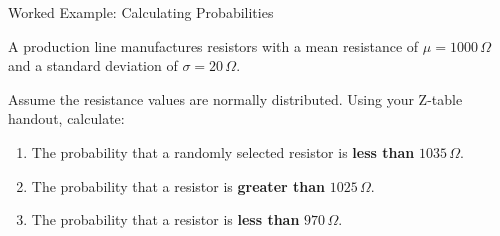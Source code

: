 \begin{frame}{Worked Example: Calculating Probabilities}
    \begin{example}
        A production line manufactures resistors with a mean resistance of $\mu = 1000\,\Omega$ and a standard deviation of $\sigma = 20\,\Omega$. 
        
        \vspace{0.2cm}
        Assume the resistance values are normally distributed. Using your Z-table handout, calculate:
        \begin{enumerate}
            \item The probability that a randomly selected resistor is \textbf{less than} $1035\,\Omega$.
            \item The probability that a resistor is \textbf{greater than} $1025\,\Omega$.
            \item The probability that a resistor is \textbf{less than} $970\,\Omega$.
        \end{enumerate}
    \end{example}


\end{frame}

